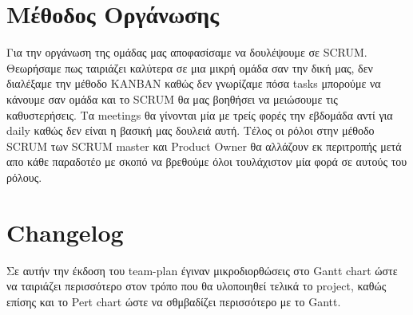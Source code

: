 \documentclass{article}
\begin{document}
\begin{center}

 
\end{center}
\clearpage

\section{Μέθοδος Οργάνωσης}
Για την οργάνωση της ομάδας μας αποφασίσαμε να δουλέψουμε σε SCRUM. Θεωρήσαμε πως ταιριάζει καλύτερα σε μια μικρή ομάδα σαν την δική μας, δεν διαλέξαμε την μέθοδο KANBAN καθώς δεν γνωρίζαμε πόσα tasks μπορούμε να κάνουμε σαν ομάδα και το SCRUM θα μας βοηθήσει να μειώσουμε τις καθυστερήσεις. Τα meetings θα γίνονται μία με τρείς φορές την εβδομάδα αντί για daily καθώς δεν είναι η βασική μας δουλειά αυτή. Τέλος οι ρόλοι στην μέθοδο SCRUM των SCRUM master και Product Owner θα αλλάζουν εκ περιτροπής μετά απο κάθε παραδοτέο με σκοπό να βρεθούμε όλοι τουλάχιστον μία φορά σε αυτούς του ρόλους.

\section{Changelog}
Σε αυτήν την έκδοση του team-plan έγιναν μικροδιορθώσεις στο Gantt chart ώστε να ταιριάζει περισσότερο στον τρόπο που θα υλοποιηθεί τελικά το project, καθώς επίσης και το Pert chart ώστε να σθμβαδίζει περισσότερο με το Gantt.
\end{document}
